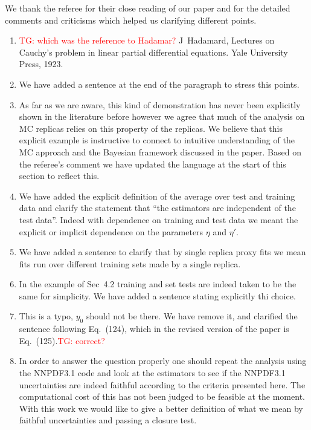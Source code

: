 \documentclass[11pt,a4paper]{article}
\numberwithin{equation}{section}
\numberwithin{figure}{section}
\numberwithin{table}{section}
\begin{document}
We thank the referee for their close reading of our paper and for the detailed comments and criticisms 
which helped us clarifying different points.
\begin{enumerate}
    \item \textcolor{red}{TG: which was the reference to Hadamar?} J~Hadamard, 
Lectures on Cauchy's problem in linear partial differential equations. Yale University Press, 1923.
    \item We have added a sentence at the end of the paragraph to stress this points.
    \item As far as we are aware, this kind of demonstration has never been explicitly
    shown in the literature before however we agree that much of the analysis on
    MC replicas relies on this property of the replicas. We believe that this explicit example
    is instructive to connect to intuitive understanding of the MC approach and
    the Bayesian framework discussed in the paper. Based on the referee's comment
    we have updated the language at the start of this section to reflect this.
    \item We have added the explicit definition of the average over test and training data and 
    clarify the statement that ``the estimators are independent of the test data''. Indeed with dependence
    on training and test data we meant the explicit or implicit dependence on the parameters $\eta$ and $\eta'$.
    \item We have added a sentence to clarify that by single replica proxy fits we mean fits
    run over different training sets made by a single replica. 
    \item In the example of Sec~4.2 training and set tests are indeed taken to be the same for simplicity.
    We have added a sentence stating explicitly thi choice.
    \item This is a typo, $y_0$ should not be there. We have remove it, and clarified the sentence following Eq.~(124),
    which in the revised version of the paper is Eq.~(125).\textcolor{red}{TG: correct?}
    \item In order to answer the question properly one should repeat the analysis using the 
    NNPDF3.1 code and look at the estimators to see if the NNPDF3.1 uncertainties are indeed faithful according to 
    the criteria presented here.
    The computational cost of this has not been judged to be feasible at the moment.
    With this work we would like to give a better definition of what we mean by faithful 
    uncertainties and passing a closure test.

\end{enumerate}
\end{document}

